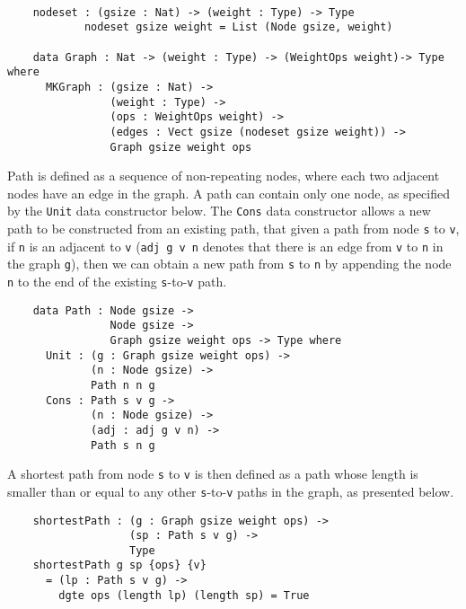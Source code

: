 \\
\begin{lstlisting}
	nodeset : (gsize : Nat) -> (weight : Type) -> Type
			nodeset gsize weight = List (Node gsize, weight)

	data Graph : Nat -> (weight : Type) -> (WeightOps weight)-> Type where
	  MKGraph : (gsize : Nat) ->
	            (weight : Type) ->
	            (ops : WeightOps weight) ->
	            (edges : Vect gsize (nodeset gsize weight)) ->
	            Graph gsize weight ops
\end{lstlisting}
Path is defined as a sequence of non-repeating nodes, where each two adjacent nodes have an edge in the graph. A path can contain only one node, as specified by the \texttt{Unit} data constructor below. The \texttt{Cons} data constructor allows a new path to be constructed from an existing path, that given a path from node \texttt{s} to \texttt{v}, if \texttt{n} is an adjacent to \texttt{v} (\texttt{adj g v n} denotes that there is an edge from \texttt{v} to \texttt{n} in the graph \texttt{g}), then we can obtain a new path from \texttt{s} to \texttt{n} by appending the node \texttt{n} to the end of the existing \texttt{s}-to-\texttt{v} path. 
\\
\begin{lstlisting}
	data Path : Node gsize ->
	            Node gsize ->
	            Graph gsize weight ops -> Type where
	  Unit : (g : Graph gsize weight ops) ->
	         (n : Node gsize) ->
	         Path n n g
	  Cons : Path s v g ->
	         (n : Node gsize) ->
	         (adj : adj g v n) ->
	         Path s n g
\end{lstlisting}
A shortest path from node \texttt{s} to \texttt{v} is then defined as a path whose length is smaller than or equal to any other \texttt{s}-to-\texttt{v} paths in the graph, as presented below. 
\\
\begin{lstlisting}
	shortestPath : (g : Graph gsize weight ops) ->
	               (sp : Path s v g) ->
	               Type
	shortestPath g sp {ops} {v}
	  = (lp : Path s v g) ->
	    dgte ops (length lp) (length sp) = True
\end{lstlisting}


